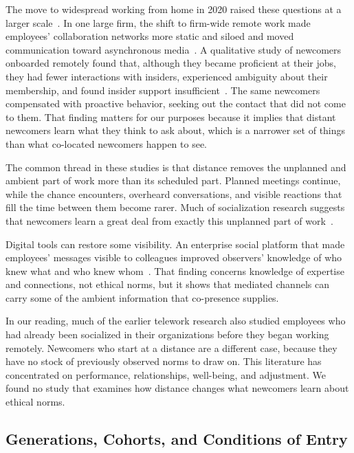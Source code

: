 \documentclass[12pt,a4paper]{article}
\theoremstyle{definition}
\begin{document}
The move to widespread working from home in 2020 raised these questions at a larger scale~\citep{kniffin2021covid}. In one large firm, the shift to firm-wide remote work made employees' collaboration networks more static and siloed and moved communication toward asynchronous media~\citep{yang2022effects}. A qualitative study of newcomers onboarded remotely found that, although they became proficient at their jobs, they had fewer interactions with insiders, experienced ambiguity about their membership, and found insider support insufficient~\citep{paik2026membership}. The same newcomers compensated with proactive behavior, seeking out the contact that did not come to them. That finding matters for our purposes because it implies that distant newcomers learn what they think to ask about, which is a narrower set of things than what co-located newcomers happen to see.

The common thread in these studies is that distance removes the unplanned and ambient part of work more than its scheduled part. Planned meetings continue, while the chance encounters, overheard conversations, and visible reactions that fill the time between them become rarer. Much of socialization research suggests that newcomers learn a great deal from exactly this unplanned part of work~\citep{reichers1987interactionist}.

Digital tools can restore some visibility. An enterprise social platform that made employees' messages visible to colleagues improved observers' knowledge of who knew what and who knew whom~\citep{leonardi2015ambient}. That finding concerns knowledge of expertise and connections, not ethical norms, but it shows that mediated channels can carry some of the ambient information that co-presence supplies.

In our reading, much of the earlier telework research also studied employees who had already been socialized in their organizations before they began working remotely. Newcomers who start at a distance are a different case, because they have no stock of previously observed norms to draw on. This literature has concentrated on performance, relationships, well-being, and adjustment. We found no study that examines how distance changes what newcomers learn about ethical norms.

\subsection{Generations, Cohorts, and Conditions of Entry}
\end{document}
